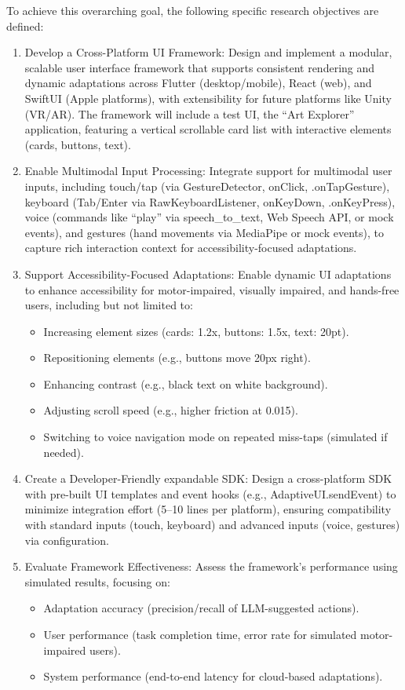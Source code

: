 \documentclass[openany]{book}
\begin{document}
To achieve this overarching goal, the following specific research objectives are defined:
\begin{enumerate}
    \item Develop a Cross-Platform UI Framework: Design and implement a modular, scalable user interface framework that supports consistent rendering and dynamic adaptations across Flutter (desktop/mobile), React (web), and SwiftUI (Apple platforms), with extensibility for future platforms like Unity (VR/AR). The framework will include a test UI, the “Art Explorer” application, featuring a vertical scrollable card list with interactive elements (cards, buttons, text).
    \item Enable Multimodal Input Processing: Integrate support for multimodal user inputs, including touch/tap (via GestureDetector, onClick, .onTapGesture), keyboard (Tab/Enter via RawKeyboardListener, onKeyDown, .onKeyPress), voice (commands like “play” via speech\_to\_text, Web Speech API, or mock events), and gestures (hand movements via MediaPipe or mock events), to capture rich interaction context for accessibility-focused adaptations.
    \item Support Accessibility-Focused Adaptations: Enable dynamic UI adaptations to enhance accessibility for motor-impaired, visually impaired, and hands-free users, including but not limited to:
        \begin{itemize}
            \item Increasing element sizes (cards: 1.2x, buttons: 1.5x, text: 20pt).
            \item Repositioning elements (e.g., buttons move 20px right).
            \item Enhancing contrast (e.g., black text on white background).
            \item Adjusting scroll speed (e.g., higher friction at 0.015).
            \item Switching to voice navigation mode on repeated miss-taps (simulated if needed).
        \end{itemize}
    \item Create a Developer-Friendly expandable SDK: Design a cross-platform SDK with pre-built UI templates and event hooks (e.g., AdaptiveUI.sendEvent) to minimize integration effort (5–10 lines per platform), ensuring compatibility with standard inputs (touch, keyboard) and advanced inputs (voice, gestures) via configuration.
    \item Evaluate Framework Effectiveness: Assess the framework’s performance using simulated results, focusing on:
    \begin{itemize}
        \item Adaptation accuracy (precision/recall of LLM-suggested actions).
        \item User performance (task completion time, error rate for simulated motor-impaired users).
        \item System performance (end-to-end latency for cloud-based adaptations).
    \end{itemize}
\end{enumerate}
\medskip
\end{document}
